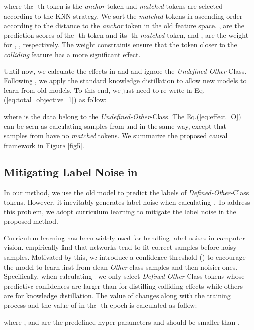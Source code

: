 \documentclass[11pt]{article}
\begin{document}
where the -th token is the \textit{anchor} token and  \textit{matched} tokens are selected according to the KNN strategy.
We sort the  \textit{matched} tokens in ascending order according to the distance to the \textit{anchor} token in the old feature space.
,  are the prediction scores of the -th token and its -th \textit{matched} token, and ,  are the weight for , , respectively.
The weight constraints ensure that the token closer to the \textit{colliding} feature has a more significant effect.

Until now, we calculate the effects in  and  and ignore the \textit{Undefined-Other}-Class.
Following \citet{monaikul2021continual}, we apply the standard knowledge distillation to allow new models to learn from old models.
To this end, we just need to re-write  in Eq.(\ref{eq:total_objective_1}) as follow:

where  is the data belong to the \textit{Undefined-Other}-Class.
The Eq.(\ref{eq:effect_O}) can be seen as calculating samples from  and  in the same way, except that samples from  have no \textit{matched} tokens. 
We summarize the proposed causal framework in Figure \ref{fig5}.

\subsection{Mitigating Label Noise in \label{subsec:4.3}}
In our method, we use the old model to predict the labels of \textit{Defined-Other}-Class tokens.
However, it inevitably generates label noise when calculating .
To address this problem, we adopt curriculum learning to mitigate the label noise in the proposed method.

Curriculum learning has been widely used for handling label noises \citep{guo2018curriculumnet} in computer vision.
\citet{arazo2019unsupervised} empirically find that networks tend to fit correct samples before noisy samples.
Motivated by this,  we introduce a confidence threshold  () to encourage the model to learn first from clean \textit{Other}-class samples and then noisier ones.
Specifically, when calculating , we only select \textit{Defined-Other}-Class tokens whose predictive confidences are larger than  for distilling colliding effects while others are for knowledge distillation.
The value of  changes along with the training process and the value of  in the -th epoch is calculated as follow:

where ,  and  are the predefined hyper-parameters and  should be smaller than .
\end{document}
